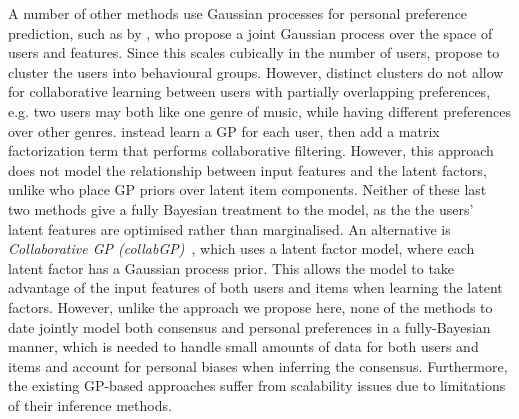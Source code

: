 
A number of other methods use Gaussian processes 
for personal preference prediction, 
such as by \citet{guo2010gaussian}, who propose a joint Gaussian process over the
space of users and features. Since this scales cubically
in the number of users, \citet{abbasnejad2013learning} 
propose to cluster the users into behavioural groups.
However, distinct clusters do not
allow for collaborative learning between users with partially overlapping preferences, e.g. two users may both like one genre of music, 
while having different preferences over other genres. 
\citet{khan2014scalable} instead learn a GP for each user,
then add a matrix factorization term that performs collaborative filtering.
However, this approach does not model the relationship between
 input features and the latent factors,
 unlike \citet{lawrence2009non} who place GP priors over latent item components.
 Neither of these last two methods
 give a fully Bayesian treatment to the model, as the the users' latent features
 are optimised rather than marginalised.
An alternative is \emph{Collaborative GP (collabGP)}~\citep{houlsby2012collaborative},
which uses a latent factor model, where each latent factor has a Gaussian process prior. 
This allows the model to take advantage of the input features of both
users and items when learning the latent factors. 
However, unlike the approach we propose here, 
none of the methods to date jointly model both consensus 
and personal preferences in a fully-Bayesian manner,
which is needed to handle small amounts of data for both users and items
and account for personal biases when inferring the consensus.
Furthermore, the existing GP-based approaches
suffer from scalability issues due to limitations of their inference methods.

